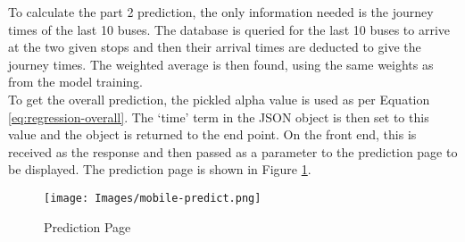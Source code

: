 To calculate the part 2 prediction, the only information needed is the journey times of the last 10 buses. The database is queried for the last 10 buses to arrive at the two given stops and then their arrival times are deducted to give the journey times. The weighted average is then found, using the same weights as from the model training. \\

To get the overall prediction, the pickled alpha value is used as per Equation \ref{eq:regression-overall}. The `time' term in the JSON object is then set to this value and the object is returned to the end point. On the front end, this is received as the response and then passed as a parameter to the prediction page to be displayed. The prediction page is shown in Figure \ref{fig:mobile-predict-page}.

\begin{figure}[H]
\begin{center}
    \texttt{[image: Images/mobile-predict.png]}
    \caption{Prediction Page}
    \label{fig:mobile-predict-page}
\end{center}
\end{figure}

\clearpage